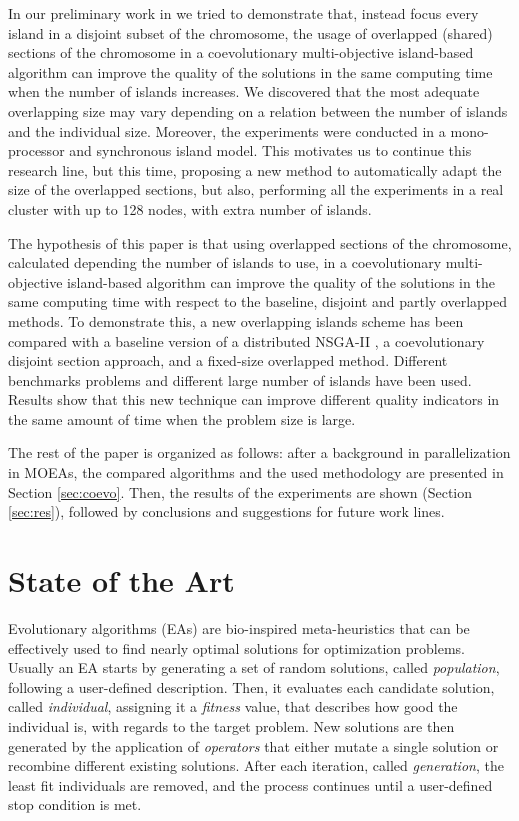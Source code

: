 \documentclass[preprint]{elsarticle}
\begin{document}
In our preliminary work in \citep{Garcia16hpmoon} we tried to demonstrate that, instead focus every island in a disjoint subset of the chromosome, the usage of overlapped (shared) sections of the chromosome in a coevolutionary multi-objective island-based algorithm can improve the quality of the solutions in the same computing time when the number of islands increases. We discovered that the most adequate overlapping size may vary depending on a relation between the number of islands and the individual size. Moreover, the experiments were conducted in a mono-processor and synchronous island model. This motivates us to continue this research line, but this time, proposing a new method to automatically adapt the size of the overlapped sections, but also, performing all the experiments in a real cluster with up to 128 nodes, with extra number of islands.


The hypothesis of this paper is that using overlapped sections of the chromosome, calculated depending the number of islands to use, in a coevolutionary multi-objective island-based algorithm can improve the quality of the solutions in the same computing time with respect to the baseline, disjoint and partly overlapped methods. To demonstrate this, a new overlapping islands scheme has been compared with a baseline version of a distributed NSGA-II \citep{Deb00NSGAII}, a coevolutionary disjoint section approach, and a fixed-size overlapped method. Different benchmarks problems and different large number of islands have been used. Results show that this new technique can improve different quality indicators in the same amount of time when the problem size is large. 

The rest of the paper is organized as follows: after a background in parallelization in MOEAs, 
the compared algorithms and the used methodology are presented in Section \ref{sec:coevo}. %
Then, the results of the experiments are shown (Section \ref{sec:res}), followed by conclusions and suggestions for future work lines.


%
\section{State of the Art}
\label{sec:soa}

Evolutionary algorithms (EAs) \citep{DBLP:series/ncs/EibenS15,DeJong2006} are bio-inspired meta-heuristics that can be effectively used to find nearly optimal solutions for optimization problems. Usually an EA starts by generating a set of random solutions, called \emph{population}, following a user-defined description. Then, it evaluates each candidate solution, called \emph{individual}, assigning it a \emph{fitness} value, that describes how good the individual is, with regards to the target problem. New solutions are then generated by the application of \emph{operators} that either mutate a single solution or recombine different existing solutions. After each iteration, called \emph{generation}, the least fit individuals are removed, and the process continues until a user-defined stop condition is met.
\end{document}
